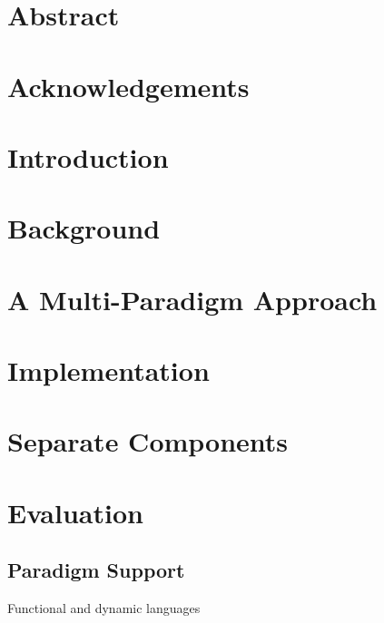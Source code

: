 \documentclass[11pt]{article}
\begin{document}

\clearpage

\onehalfspacing{}

\section*{Abstract}
\clearpage

\section*{Acknowledgements}
\clearpage

\tableofcontents
\clearpage

\section{Introduction}
\label{sec:intro}


\clearpage
\section{Background}
\label{sec:background}


\clearpage
\section{A Multi-Paradigm Approach}
\label{sec:design}


\clearpage
\section{Implementation}
\label{sec:implementation}


\clearpage
\section{Separate Components}
\label{sec:separate-components}


\clearpage
\section{Evaluation}

\subsection{Paradigm Support}

Functional and dynamic languages
\end{document}
